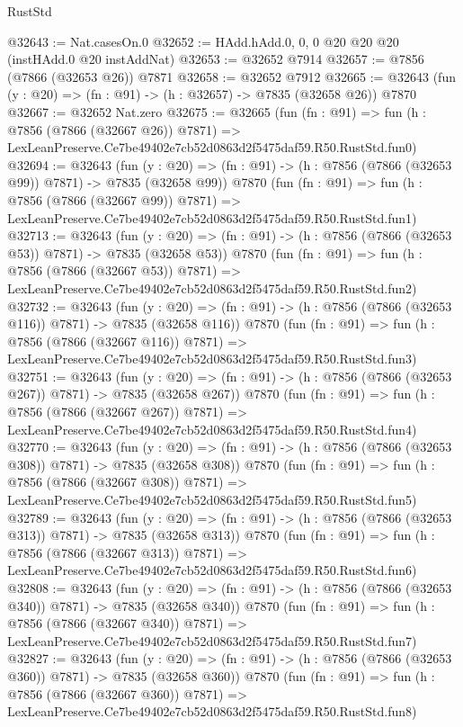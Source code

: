 \begin{lexlean}{RustStd}
\begin{coremodule}
@32643 := Nat.casesOn.{0}
@32652 := HAdd.hAdd.{0, 0, 0} @20 @20 @20 (instHAdd.{0} @20 instAddNat)
@32653 := @32652 @7914
@32657 := @7856 (@7866 (@32653 @26)) @7871
@32658 := @32652 @7912
@32665 := @32643 (fun (y : @20) => (fn : @91) -> (h : @32657) -> @7835 (@32658 @26)) @7870
@32667 := @32652 Nat.zero
@32675 := @32665
    (fun (fn : @91) =>
    fun (h : @7856 (@7866 (@32667 @26)) @7871) =>
    LexLeanPreserve.Ce7be49402e7cb52d0863d2f5475daf59.R50.RustStd.fun0)
@32694 := @32643
    (fun (y : @20) => (fn : @91) -> (h : @7856 (@7866 (@32653 @99)) @7871) -> @7835 (@32658 @99))
    @7870
    (fun (fn : @91) =>
    fun (h : @7856 (@7866 (@32667 @99)) @7871) =>
    LexLeanPreserve.Ce7be49402e7cb52d0863d2f5475daf59.R50.RustStd.fun1)
@32713 := @32643
    (fun (y : @20) => (fn : @91) -> (h : @7856 (@7866 (@32653 @53)) @7871) -> @7835 (@32658 @53))
    @7870
    (fun (fn : @91) =>
    fun (h : @7856 (@7866 (@32667 @53)) @7871) =>
    LexLeanPreserve.Ce7be49402e7cb52d0863d2f5475daf59.R50.RustStd.fun2)
@32732 := @32643
    (fun (y : @20) => (fn : @91) -> (h : @7856 (@7866 (@32653 @116)) @7871) -> @7835 (@32658 @116))
    @7870
    (fun (fn : @91) =>
    fun (h : @7856 (@7866 (@32667 @116)) @7871) =>
    LexLeanPreserve.Ce7be49402e7cb52d0863d2f5475daf59.R50.RustStd.fun3)
@32751 := @32643
    (fun (y : @20) => (fn : @91) -> (h : @7856 (@7866 (@32653 @267)) @7871) -> @7835 (@32658 @267))
    @7870
    (fun (fn : @91) =>
    fun (h : @7856 (@7866 (@32667 @267)) @7871) =>
    LexLeanPreserve.Ce7be49402e7cb52d0863d2f5475daf59.R50.RustStd.fun4)
@32770 := @32643
    (fun (y : @20) => (fn : @91) -> (h : @7856 (@7866 (@32653 @308)) @7871) -> @7835 (@32658 @308))
    @7870
    (fun (fn : @91) =>
    fun (h : @7856 (@7866 (@32667 @308)) @7871) =>
    LexLeanPreserve.Ce7be49402e7cb52d0863d2f5475daf59.R50.RustStd.fun5)
@32789 := @32643
    (fun (y : @20) => (fn : @91) -> (h : @7856 (@7866 (@32653 @313)) @7871) -> @7835 (@32658 @313))
    @7870
    (fun (fn : @91) =>
    fun (h : @7856 (@7866 (@32667 @313)) @7871) =>
    LexLeanPreserve.Ce7be49402e7cb52d0863d2f5475daf59.R50.RustStd.fun6)
@32808 := @32643
    (fun (y : @20) => (fn : @91) -> (h : @7856 (@7866 (@32653 @340)) @7871) -> @7835 (@32658 @340))
    @7870
    (fun (fn : @91) =>
    fun (h : @7856 (@7866 (@32667 @340)) @7871) =>
    LexLeanPreserve.Ce7be49402e7cb52d0863d2f5475daf59.R50.RustStd.fun7)
@32827 := @32643
    (fun (y : @20) => (fn : @91) -> (h : @7856 (@7866 (@32653 @360)) @7871) -> @7835 (@32658 @360))
    @7870
    (fun (fn : @91) =>
    fun (h : @7856 (@7866 (@32667 @360)) @7871) =>
    LexLeanPreserve.Ce7be49402e7cb52d0863d2f5475daf59.R50.RustStd.fun8)

\end{coremodule}
\end{lexlean}
